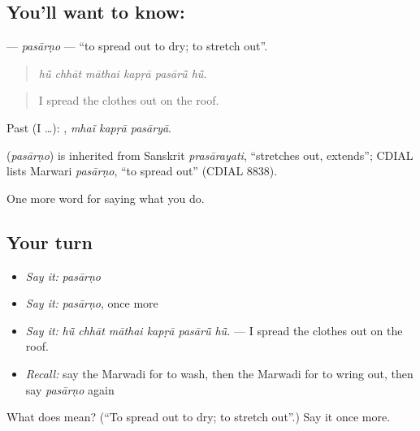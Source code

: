 \subsection*{You'll want to know: }
\textbf{} — \emph{pasārṇo} — \textquotedblleft{}to spread out to dry; to stretch out\textquotedblright{}.

\begin{quote}
     
\end{quote}

\begin{quote}
\emph{hū̃ chhāt māthai kapṛā pasārū̃ hū̃.}
\end{quote}

\begin{quote}
I spread the clothes out on the roof.
\end{quote}

Past (I …):   , \emph{mhaĩ kapṛā pasāryā}.

\begin{cousinweb}
\textbf{} (\emph{pasārṇo}) is inherited from Sanskrit \emph{prasārayati}, \textquotedblleft{}stretches out, extends\textquotedblright{}; CDIAL lists Marwari \emph{pasārṇo}, \textquotedblleft{}to spread out\textquotedblright{} (CDIAL 8838).
\end{cousinweb}

\begin{grammarlens}[title={What you've built}]
One more word for saying what you do.
\end{grammarlens}

\subsection*{Your turn}
\begin{itemize}
\raggedright
  \item \emph{Say it:} \emph{pasārṇo}
  \item \emph{Say it:} \emph{pasārṇo}, once more
  \item \emph{Say it:} \emph{hū̃ chhāt māthai kapṛā pasārū̃ hū̃.} — I spread the clothes out on the roof.
  \item \emph{Recall:} say the Marwadi for to wash, then the Marwadi for to wring out, then say \emph{pasārṇo} again
\end{itemize}

\begin{tcolorbox}[breakable,colback=teal!4,colframe=teal!35!black,title={Before you move on}]
What does  mean? (\textquotedblleft{}To spread out to dry; to stretch out\textquotedblright{}.) Say it once more.
\end{tcolorbox}
